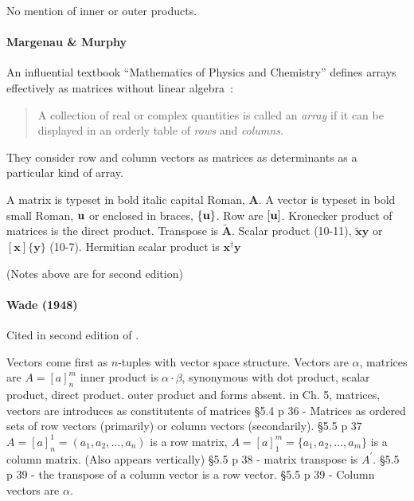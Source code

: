 No mention of inner or outer products.


\paragraph{Margenau \& Murphy~\cite{Margenau1943}}

An influential textbook ``Mathematics of Physics and Chemistry'' defines arrays
effectively as matrices without linear algebra~\cite[\S 10.1, p. 288]{Margenau1943}:

\begin{quote}
A collection of real or complex quantities is called an
\textit{array} if it can be displayed in an orderly table of \textit{rows} and \textit{columns}.
\end{quote}

They consider row and column vectors as matrices as determinants as a particular kind of array.

A matrix is typeset in bold italic capital Roman, $\boldsymbol A$.
A vector is typeset in bold small Roman, $\textbf u$ or enclosed in braces, $\{ \textbf u \}$.
Row are $[\textbf u ]$.
Kronecker product of matrices is the direct product.
Transpose is $\tilde{\boldsymbol A}$.
Scalar product (10-11), $\tilde{\mathbf x} \mathbf y$ or $[\mathbf x] \{\mathbf y\}$ (10-7).
Hermitian scalar product is $\mathbf x^\dagger \mathbf y$



(Notes above are for second edition)



\paragraph{Wade (1948)~\cite{Wade1948}}

Cited in second edition of \cite{Margenau1943}.

Vectors come first as $n$-tuples with vector space structure.
Vectors are $\alpha$, matrices are $A = [a]^m_n$
inner product is $\alpha \cdot \beta$, synonymous with dot product, scalar product, direct product.
outer product and forms absent.
in Ch. 5, matrices, vectors are introduces as constitutents of matrices
\S 5.4 p 36 - Matrices as ordered sets of row vectors (primarily) or column vectors (secondarily).
\S 5.5 p 37 $A = [a]^1_n = (a_1, a_2, \dots, a_n)$ is a row matrix,
$A = [a]^m_1 = \{a_1, a_2, \dots, a_m \}$ is a column matrix. (Also appears vertically)
\S 5.5 p 38 - matrix transpose is $A^\prime$.
\S 5.5 p 39 - the transpose of a column vector is a row vector.
\S 5.5 p 39 - Column vectors are $\alpha$.



